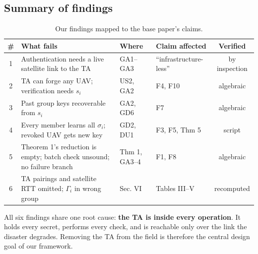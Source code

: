 \subsection{Summary of findings}
\begin{table}[H]
\centering\small
\caption{Our findings mapped to the base paper's claims.}
\label{tab:findings}
\begin{tabularx}{\linewidth}{@{}c>{\raggedright\arraybackslash}X l l c@{}}
\toprule
\# & What fails & Where & Claim affected & Verified\\
\midrule
1 & Authentication needs a live satellite link to the TA & GA1--GA3 & ``infrastructure-less'' & by inspection\\
2 & TA can forge any UAV; verification needs $s_i$ & US2, GA2 & F4, F10 & algebraic\\
3 & Past group keys recoverable from $s_i$ & GA2, GD6 & F7 & algebraic\\
4 & Every member learns all $\sigma_i$; revoked UAV gets new key & GD2, DU1 & F3, F5, Thm 5 & script\\
5 & Theorem 1's reduction is empty; batch check unsound; no failure branch & Thm 1, GA3--4 & F1, F8 & algebraic\\
6 & TA pairings and satellite RTT omitted; $\Gamma_i$ in wrong group & Sec. VI & Tables III--V & recomputed\\
\bottomrule
\end{tabularx}
\end{table}

\begin{keybox}
All six findings share one root cause: \textbf{the TA is inside every operation}. It holds every secret, performs every check, and is reachable only over the
link the disaster degrades. Removing the TA from the field is therefore the central design goal of our framework.
\end{keybox}
